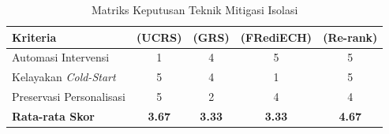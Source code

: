 \begin{table}[H]
    \centering
    \caption{Matriks Keputusan Teknik Mitigasi Isolasi}
    \label{tbl:solusi-r3}
    \renewcommand{\arraystretch}{1.3} %
    \begin{tabular}{|p{4.5cm}|c|c|c|c|}
    \hline
    \textbf{Kriteria} & \textbf{(UCRS)} & \textbf{(GRS)} & \textbf{(FRediECH)} & \textbf{(Re-rank)} \\
    \hline
    Automasi Intervensi & 1 & 4 & 5 & 5 \\
    \hline
    Kelayakan \textit{Cold-Start} & 5 & 4 & 1 & 5 \\
    \hline
    Preservasi Personalisasi & 5 & 2 & 4 & 4 \\
    \hline
    \textbf{Rata-rata Skor} & \textbf{3.67} & \textbf{3.33} & \textbf{3.33} & \textbf{4.67} \\
    \hline
    \end{tabular}
\end{table}